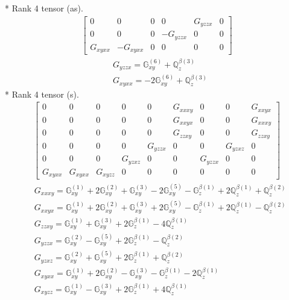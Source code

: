 \documentclass[fleqn,8pt,landscape]{jsarticle}
\begin{document}
* Rank 4 tensor (as).
\begin{align*}
\begin{bmatrix} 0 & 0 & 0 & 0 & G_{yzzx} & 0 \\ 0 & 0 & 0 & - G_{yzzx} & 0 & 0 \\ G_{xyxx} & - G_{xyxx} & 0 & 0 & 0 & 0 \end{bmatrix}
\end{align*}
\begin{align*}
& G_{yzzx} = \mathbb{G}_{xy}^{(6)} + \mathbb{Q}_{z}^{\beta(3)} \\
& G_{xyxx} = - 2 \mathbb{G}_{xy}^{(6)} + \mathbb{Q}_{z}^{\beta(3)}
\end{align*}
* Rank 4 tensor (s).
\begin{align*}
\begin{bmatrix} 0 & 0 & 0 & 0 & 0 & G_{xxxy} & 0 & 0 & G_{xxyx} \\ 0 & 0 & 0 & 0 & 0 & G_{xxyx} & 0 & 0 & G_{xxxy} \\ 0 & 0 & 0 & 0 & 0 & G_{zzxy} & 0 & 0 & G_{zzxy} \\ 0 & 0 & 0 & 0 & G_{yzzx} & 0 & 0 & G_{yzxz} & 0 \\ 0 & 0 & 0 & G_{yzxz} & 0 & 0 & G_{yzzx} & 0 & 0 \\ G_{xyxx} & G_{xyxx} & G_{xyzz} & 0 & 0 & 0 & 0 & 0 & 0 \end{bmatrix}
\end{align*}
\begin{align*}
& G_{xxxy} = \mathbb{G}_{xy}^{(1)} + 2 \mathbb{G}_{xy}^{(2)} + \mathbb{G}_{xy}^{(3)} - 2 \mathbb{G}_{xy}^{(5)} - \mathbb{G}_{z}^{\beta(1)} + 2 \mathbb{Q}_{z}^{\beta(1)} + \mathbb{Q}_{z}^{\beta(2)} \\
& G_{xxyx} = \mathbb{G}_{xy}^{(1)} + 2 \mathbb{G}_{xy}^{(2)} + \mathbb{G}_{xy}^{(3)} + 2 \mathbb{G}_{xy}^{(5)} - \mathbb{G}_{z}^{\beta(1)} + 2 \mathbb{Q}_{z}^{\beta(1)} - \mathbb{Q}_{z}^{\beta(2)} \\
& G_{zzxy} = \mathbb{G}_{xy}^{(1)} + \mathbb{G}_{xy}^{(3)} + 2 \mathbb{G}_{z}^{\beta(1)} - 4 \mathbb{Q}_{z}^{\beta(1)} \\
& G_{yzzx} = \mathbb{G}_{xy}^{(2)} - \mathbb{G}_{xy}^{(5)} + 2 \mathbb{G}_{z}^{\beta(1)} - \mathbb{Q}_{z}^{\beta(2)} \\
& G_{yzxz} = \mathbb{G}_{xy}^{(2)} + \mathbb{G}_{xy}^{(5)} + 2 \mathbb{G}_{z}^{\beta(1)} + \mathbb{Q}_{z}^{\beta(2)} \\
& G_{xyxx} = \mathbb{G}_{xy}^{(1)} + 2 \mathbb{G}_{xy}^{(2)} - \mathbb{G}_{xy}^{(3)} - \mathbb{G}_{z}^{\beta(1)} - 2 \mathbb{Q}_{z}^{\beta(1)} \\
& G_{xyzz} = \mathbb{G}_{xy}^{(1)} - \mathbb{G}_{xy}^{(3)} + 2 \mathbb{G}_{z}^{\beta(1)} + 4 \mathbb{Q}_{z}^{\beta(1)}
\end{align*}
\end{document}
